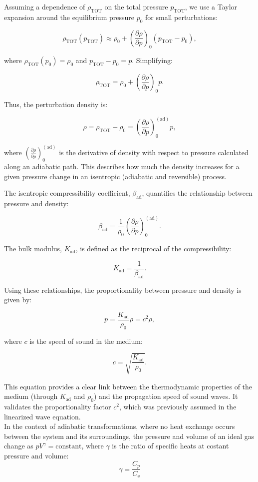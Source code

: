 \documentclass[a4paper]{article}
\begin{document}
Assuming a dependence of \(\rho_\text{TOT}\) on the total pressure \(p_\text{TOT}\), we use a Taylor expansion around the equilibrium pressure \(p_0\) for small perturbations:

\[
\rho_\text{TOT}(p_\text{TOT}) \approx \rho_0 + \left(\frac{\partial \rho}{\partial p}\right)_0 (p_\text{TOT} - p_0),
\]

where \(\rho_\text{TOT}(p_0) = \rho_0\) and \(p_\text{TOT} - p_0 = p\). Simplifying:

\[
\rho_\text{TOT} = \rho_0 + \left(\frac{\partial \rho}{\partial p}\right)_0 p.
\]

Thus, the perturbation density is:

\[
\rho = \rho_\text{TOT} - \rho_0 = \left(\frac{\partial \rho}{\partial p}\right)_0^{(\text{ad})} p,
\]


where \(\left(\frac{\partial \rho}{\partial p}\right)_0^{(\text{ad})}\) is the derivative of density with respect to pressure calculated along an adiabatic path. This describes how much the density increases for a given pressure change in an isentropic (adiabatic and reversible) process.


The isentropic compressibility coefficient, \(\beta_\text{ad}\), quantifies the relationship between pressure and density:

\[
\beta_\text{ad} = \frac{1}{\rho_0} \left(\frac{\partial \rho}{\partial p}\right)_0^{(\text{ad})}.
\]

The bulk modulus, \(K_\text{ad}\), is defined as the reciprocal of the compressibility:

\[
K_\text{ad} = \frac{1}{\beta_\text{ad}}.
\]

Using these relationships, the proportionality between pressure and density is given by:

\[
p = \frac{K_\text{ad}}{\rho_0} \rho = c^2 \rho,
\]

where \(c\) is the speed of sound in the medium:

\[
c = \sqrt{\frac{K_\text{ad}}{\rho_0}}.
\]

This equation provides a clear link between the thermodynamic properties of the medium (through \(K_\text{ad}\) and \(\rho_0\)) and the propagation speed of sound waves. It validates the proportionality factor \(c^2\), which was previously assumed in the linearized wave equation. \\


In the context of adiabatic transformations, where no heat exchange occurs between the system and its surroundings, the pressure and volume of an ideal gas change as \(p V^\gamma = \text{constant}\), where \(\gamma\) is the ratio of specific heats at costant pressure and volume:
\[ \gamma = \frac{C_p}{C_v}
\]
\end{document}
